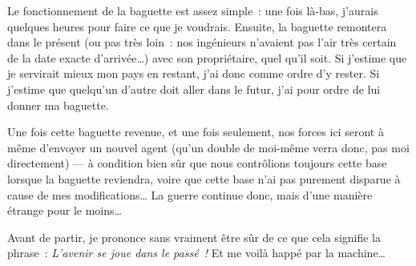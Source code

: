 {	Le fonctionnement de la baguette est assez simple~:  une fois là-bas, j’aurais quelques heures pour faire ce que je voudrais.
	Ensuite, la baguette remontera dans le présent (ou pas très loin~:  nos ingénieurs n’avaient pas l’air très certain de la date exacte d’arrivée…) avec son propriétaire, quel qu’il soit.
	Si j’estime que je servirait mieux mon pays en restant, j’ai donc comme ordre d’y rester.  Si j’estime que quelqu’un d’autre doit aller dans le futur, j’ai pour ordre de lui donner ma baguette.

	Une fois cette baguette revenue, et une fois seulement, nos forces ici seront à même d’envoyer un nouvel agent (qu’un double de moi-même verra donc, pas moi directement) — à condition bien sûr que nous contrôlions toujours cette base lorsque la baguette reviendra, voire que cette base n’ai pas purement disparue à cause de mes modifications…
	La guerre continue donc, mais d’une manière étrange pour le moins…

	Avant de partir, je prononce sans vraiment être sûr de ce que cela signifie la phrase~:  \emph{L’avenir se joue dans le passé~!}
	Et me voilà happé par la machine…
}

